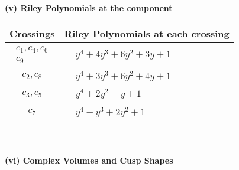 \documentclass[1p]{elsarticle_modified}
\theoremstyle{definition}
\begin{document}
\newpage\renewcommand{\arraystretch}{1}
\flushleft \textbf{(v) Riley Polynomials at the component}\newline \\
\begin{tabular}{m{50pt}|m{274pt}}
Crossings & \hspace{64pt}Riley Polynomials at each crossing \\
\hline $$\begin{aligned}c_{1},c_{4},c_{6}\\c_{9}\end{aligned}$$&$\begin{aligned}
&y^4+4 y^3+6 y^2+3 y+1
\end{aligned}$\\
\hline $$\begin{aligned}c_{2},c_{8}\end{aligned}$$&$\begin{aligned}
&y^4+3 y^3+6 y^2+4 y+1
\end{aligned}$\\
\hline $$\begin{aligned}c_{3},c_{5}\end{aligned}$$&$\begin{aligned}
&y^4+2 y^2- y+1
\end{aligned}$\\
\hline $$\begin{aligned}c_{7}\end{aligned}$$&$\begin{aligned}
&y^4- y^3+2 y^2+1
\end{aligned}$\\
\hline
\end{tabular}\\~\\
\newpage\flushleft \textbf{(vi) Complex Volumes and Cusp Shapes}
\end{document}

